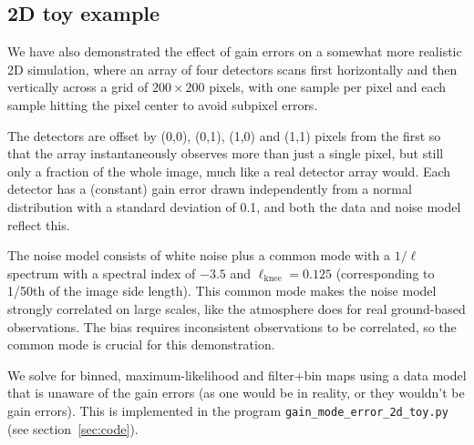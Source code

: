 \documentclass[twocolumn,apj]{aastex63}
\begin{document}
\subsection{2D toy example}
We have also demonstrated the effect of gain errors on a somewhat more realistic
2D simulation, where an array of four detectors scans first horizontally and then vertically
across a grid of $200\times200$ pixels, with one sample per pixel and each sample
hitting the pixel center to avoid subpixel errors.

The detectors are offset by
(0,0), (0,1), (1,0) and (1,1) pixels from the first so that the array instantaneously
observes more than just a single pixel, but still only a fraction of the whole image, much like
a real detector array would. Each detector has a (constant) gain error drawn
independently from a normal distribution with a standard deviation of 0.1, and both the
data and noise model reflect this.

The noise model consists of white noise plus a
common mode with a $1/\ell$ spectrum with a spectral index of $-3.5$ and $\ell_\text{knee} = 0.125$
(corresponding to 1/50th of the image side length). This common mode makes the noise model
strongly correlated on large scales, like the atmosphere does for real ground-based observations.
The bias requires inconsistent observations to be correlated, so the common mode is crucial for
this demonstration.

We solve for binned, maximum-likelihood and filter+bin
maps using a data model that is unaware of the gain errors (as one would be in reality,
or they wouldn't be gain errors). This is implemented in the program \verb|gain_mode_error_2d_toy.py|
(see section~\ref{sec:code}).
\end{document}
